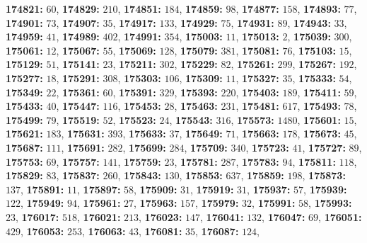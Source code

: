 \textsf{\bfseries 174821:} $60$, \textsf{\bfseries 174829:} $210$, \textsf{\bfseries 174851:} $184$, \textsf{\bfseries 174859:} $98$, \textsf{\bfseries 174877:} $158$, \textsf{\bfseries 174893:} $77$, \textsf{\bfseries 174901:} $73$, \textsf{\bfseries 174907:} $35$, \textsf{\bfseries 174917:} $133$, \textsf{\bfseries 174929:} $75$, \textsf{\bfseries 174931:} $89$, \textsf{\bfseries 174943:} $33$, \textsf{\bfseries 174959:} $41$, \textsf{\bfseries 174989:} $402$, \textsf{\bfseries 174991:} $354$, \textsf{\bfseries 175003:} $11$, \textsf{\bfseries 175013:} $2$, \textsf{\bfseries 175039:} $300$, \textsf{\bfseries 175061:} $12$, \textsf{\bfseries 175067:} $55$, \textsf{\bfseries 175069:} $128$, \textsf{\bfseries 175079:} $381$, \textsf{\bfseries 175081:} $76$, \textsf{\bfseries 175103:} $15$, \textsf{\bfseries 175129:} $51$, \textsf{\bfseries 175141:} $23$, \textsf{\bfseries 175211:} $302$, \textsf{\bfseries 175229:} $82$, \textsf{\bfseries 175261:} $299$, \textsf{\bfseries 175267:} $192$, \textsf{\bfseries 175277:} $18$, \textsf{\bfseries 175291:} $308$, \textsf{\bfseries 175303:} $106$, \textsf{\bfseries 175309:} $11$, \textsf{\bfseries 175327:} $35$, \textsf{\bfseries 175333:} $54$, \textsf{\bfseries 175349:} $22$, \textsf{\bfseries 175361:} $60$, \textsf{\bfseries 175391:} $329$, \textsf{\bfseries 175393:} $220$, \textsf{\bfseries 175403:} $189$, \textsf{\bfseries 175411:} $59$, \textsf{\bfseries 175433:} $40$, \textsf{\bfseries 175447:} $116$, \textsf{\bfseries 175453:} $28$, \textsf{\bfseries 175463:} $231$, \textsf{\bfseries 175481:} $617$, \textsf{\bfseries 175493:} $78$, \textsf{\bfseries 175499:} $79$, \textsf{\bfseries 175519:} $52$, \textsf{\bfseries 175523:} $24$, \textsf{\bfseries 175543:} $316$, \textsf{\bfseries 175573:} $1480$, \textsf{\bfseries 175601:} $15$, \textsf{\bfseries 175621:} $183$, \textsf{\bfseries 175631:} $393$, \textsf{\bfseries 175633:} $37$, \textsf{\bfseries 175649:} $71$, \textsf{\bfseries 175663:} $178$, \textsf{\bfseries 175673:} $45$, \textsf{\bfseries 175687:} $111$, \textsf{\bfseries 175691:} $282$, \textsf{\bfseries 175699:} $284$, \textsf{\bfseries 175709:} $340$, \textsf{\bfseries 175723:} $41$, \textsf{\bfseries 175727:} $89$, \textsf{\bfseries 175753:} $69$, \textsf{\bfseries 175757:} $141$, \textsf{\bfseries 175759:} $23$, \textsf{\bfseries 175781:} $287$, \textsf{\bfseries 175783:} $94$, \textsf{\bfseries 175811:} $118$, \textsf{\bfseries 175829:} $83$, \textsf{\bfseries 175837:} $260$, \textsf{\bfseries 175843:} $130$, \textsf{\bfseries 175853:} $637$, \textsf{\bfseries 175859:} $198$, \textsf{\bfseries 175873:} $137$, \textsf{\bfseries 175891:} $11$, \textsf{\bfseries 175897:} $58$, \textsf{\bfseries 175909:} $31$, \textsf{\bfseries 175919:} $31$, \textsf{\bfseries 175937:} $57$, \textsf{\bfseries 175939:} $122$, \textsf{\bfseries 175949:} $94$, \textsf{\bfseries 175961:} $27$, \textsf{\bfseries 175963:} $157$, \textsf{\bfseries 175979:} $32$, \textsf{\bfseries 175991:} $58$, \textsf{\bfseries 175993:} $23$, \textsf{\bfseries 176017:} $518$, \textsf{\bfseries 176021:} $213$, \textsf{\bfseries 176023:} $147$, \textsf{\bfseries 176041:} $132$, \textsf{\bfseries 176047:} $69$, \textsf{\bfseries 176051:} $429$, \textsf{\bfseries 176053:} $253$, \textsf{\bfseries 176063:} $43$, \textsf{\bfseries 176081:} $35$, \textsf{\bfseries 176087:} $124$, 
